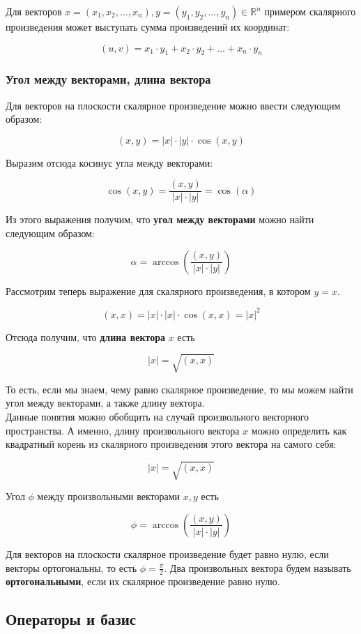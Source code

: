 \documentclass{article}
\begin{document}
Для векторов $x = (x_1, x_2, \dots, x_n), y = (y_1, y_2, \dots, y_n) \in \mathbb{R}^n$ примером скалярного произведения может выступать сумма произведений их координат:

$$ (u, v) = x_1 \cdot y_1 + x_2 \cdot y_2 + \dots + x_n \cdot y_n$$

\subsubsection{Угол между векторами, длина вектора}

Для векторов на плоскости скалярное произведение можно ввести следующим образом:

$$(x, y) = |x| \cdot |y| \cdot \cos(x, y)$$

Выразим отсюда косинус угла между векторами:

$$ \cos(x, y) = \frac{(x, y)}{|x| \cdot |y|} = \cos (\alpha) $$

Из этого выражения получим, что \textbf{угол между векторами} можно найти следующим образом:

$$ \alpha = \arccos\left(\frac{(x, y)}{|x| \cdot |y|}\right) $$

Рассмотрим теперь выражение для скалярного произведения, в котором $y = x$.

$$ (x, x) = |x| \cdot |x| \cdot \cos(x, x) = {|x|}^2 $$

Отсюда получим, что \textbf{длина вектора} $x$ есть

$$ |x| = \sqrt{(x, x)} $$

То есть, если мы знаем, чему равно скалярное произведение, то мы можем найти угол между векторами, а также длину вектора. \\

Данные понятия можно обобщить на случай произвольного векторного пространства. А именно, длину произвольного вектора $x$ можно определить как квадратный корень из скалярного произведения этого вектора на самого себя:

$$ |x| = \sqrt{(x, x)} $$

Угол $\phi$ между произвольными векторами $x, y$ есть

$$ \phi = \arccos\left(\frac{(x, y)}{|x| \cdot |y|}\right) $$

Для векторов на плоскости скалярное произведение будет равно нулю, если векторы ортогональны, то есть $\phi = \frac{\pi}{2}$. Два произвольных вектора будем называть \textbf{ортогональными}, если их скалярное произведение равно нулю.

\subsection{Операторы и базис}
\end{document}
